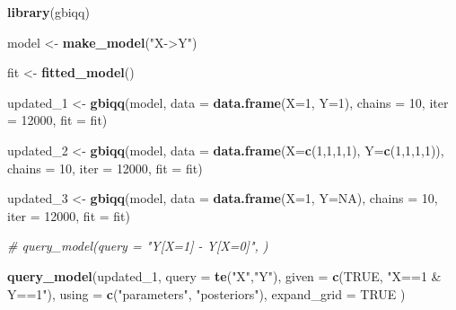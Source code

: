 \documentclass[
  12pt,
]{book}
\newenvironment{Shaded}{\begin{snugshade}}{\end{snugshade}}
\newcommand{\CommentTok}[1]{\textcolor[rgb]{0.56,0.35,0.01}{\textit{#1}}}
\newcommand{\DataTypeTok}[1]{\textcolor[rgb]{0.13,0.29,0.53}{#1}}
\newcommand{\DecValTok}[1]{\textcolor[rgb]{0.00,0.00,0.81}{#1}}
\newcommand{\KeywordTok}[1]{\textcolor[rgb]{0.13,0.29,0.53}{\textbf{#1}}}
\newcommand{\NormalTok}[1]{#1}
\newcommand{\OtherTok}[1]{\textcolor[rgb]{0.56,0.35,0.01}{#1}}
\newcommand{\StringTok}[1]{\textcolor[rgb]{0.31,0.60,0.02}{#1}}
\begin{document}
\begin{Shaded}
\begin{Highlighting}[]
\KeywordTok{library}\NormalTok{(gbiqq)}

\NormalTok{model <-}\StringTok{ }\KeywordTok{make_model}\NormalTok{(}\StringTok{"X->Y"}\NormalTok{)}

\NormalTok{fit <-}\StringTok{ }\KeywordTok{fitted_model}\NormalTok{()}

\NormalTok{updated_}\DecValTok{1}\NormalTok{ <-}\StringTok{ }\KeywordTok{gbiqq}\NormalTok{(model, }\DataTypeTok{data =} \KeywordTok{data.frame}\NormalTok{(}\DataTypeTok{X=}\DecValTok{1}\NormalTok{, }\DataTypeTok{Y=}\DecValTok{1}\NormalTok{), }
                                     \DataTypeTok{chains =} \DecValTok{10}\NormalTok{, }\DataTypeTok{iter =} \DecValTok{12000}\NormalTok{, }\DataTypeTok{fit =}\NormalTok{ fit)}

\NormalTok{updated_}\DecValTok{2}\NormalTok{ <-}\StringTok{ }\KeywordTok{gbiqq}\NormalTok{(model, }\DataTypeTok{data =} \KeywordTok{data.frame}\NormalTok{(}\DataTypeTok{X=}\KeywordTok{c}\NormalTok{(}\DecValTok{1}\NormalTok{,}\DecValTok{1}\NormalTok{,}\DecValTok{1}\NormalTok{,}\DecValTok{1}\NormalTok{), }\DataTypeTok{Y=}\KeywordTok{c}\NormalTok{(}\DecValTok{1}\NormalTok{,}\DecValTok{1}\NormalTok{,}\DecValTok{1}\NormalTok{,}\DecValTok{1}\NormalTok{)), }
                                     \DataTypeTok{chains =} \DecValTok{10}\NormalTok{, }\DataTypeTok{iter =} \DecValTok{12000}\NormalTok{, }\DataTypeTok{fit =}\NormalTok{ fit)}

\NormalTok{updated_}\DecValTok{3}\NormalTok{ <-}\StringTok{ }\KeywordTok{gbiqq}\NormalTok{(model, }\DataTypeTok{data =} \KeywordTok{data.frame}\NormalTok{(}\DataTypeTok{X=}\DecValTok{1}\NormalTok{, }\DataTypeTok{Y=}\OtherTok{NA}\NormalTok{), }
                                     \DataTypeTok{chains =} \DecValTok{10}\NormalTok{, }\DataTypeTok{iter =} \DecValTok{12000}\NormalTok{, }\DataTypeTok{fit =}\NormalTok{ fit)}

\CommentTok{# query_model(query = "Y[X=1] - Y[X=0]", )}

\KeywordTok{query_model}\NormalTok{(updated_}\DecValTok{1}\NormalTok{, }
                        \DataTypeTok{query =} \KeywordTok{te}\NormalTok{(}\StringTok{"X"}\NormalTok{,}\StringTok{"Y"}\NormalTok{), }
                        \DataTypeTok{given =} \KeywordTok{c}\NormalTok{(}\OtherTok{TRUE}\NormalTok{, }\StringTok{"X==1 & Y==1"}\NormalTok{), }
                        \DataTypeTok{using =} \KeywordTok{c}\NormalTok{(}\StringTok{"parameters"}\NormalTok{, }\StringTok{"posteriors"}\NormalTok{), }
                        \DataTypeTok{expand_grid =} \OtherTok{TRUE}\NormalTok{ )}


\end{Highlighting}
\end{Shaded}
\end{document}
